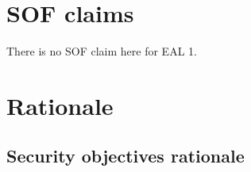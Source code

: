 \documentclass[10pt,a4paper,english]{scrbook}
\begin{document}

\hypertarget{sof-claims}{}
\chapter{SOF claims}

There is no SOF claim here for EAL 1.



\hypertarget{rationale}{}
\chapter{Rationale}



\hypertarget{security-objectives-rationale}{}

\section{Security objectives rationale}
\end{document}
